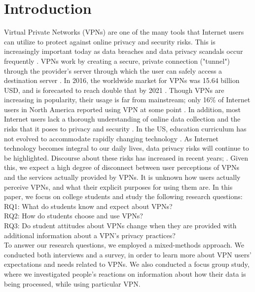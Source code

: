 \section{Introduction}

Virtual Private Networks (VPNs) are one of the many tools that Internet users can utilize to
protect against online privacy and security risks. This is increasingly important today as data breaches and data privacy scandals occur frequently \cite{brandom_4, grothaus_21, meyer_22, reilly_23, perlroth_24}. VPNs work by creating a
secure, private connection ("tunnel") through the provider's server through
which the user can safely access a destination server \cite{vaughan-nichols_25}.   In 2016, the
worldwide market for VPNs was 15.64 billion USD, and is forecasted to reach
double that by 2021 \cite{vpnmarket_3}. Though VPNs are
increasing in popularity, their usage is far from mainstream; only 16\% of
Internet users in North America reported using VPN at some point \cite{mander_27}. In
addition, most Internet users lack a thorough understanding of online data
collection and the risks that it poses to privacy and security \cite{shirazi_9}. In the US,
education curriculum has not evolved to accommodate rapidly changing
technology \cite{levin_29}. As Internet technology becomes integral to our daily lives, data privacy risks
will continue to be highlighted. Discourse about these risks has increased in
recent years; . Given this, we expect a high degree of disconnect between
user perceptions of VPNs and the services actually provided by VPNs. It is
unknown how users actually perceive VPNs, and what their explicit purposes for
using them are. In this paper, we focus on college students and study the
following research questions:\\
RQ1: What do students know and expect about VPNs?\\
RQ2: How do students choose and use VPNs?\\
RQ3: Do  student attitudes about VPNs change when they are  provided with additional information about a VPN's privacy practices?\\

To answer our research questions, we employed a mixed-methods approach. We conducted both interviews and a survey, in order to learn more about VPN users' expectations and needs related to VPNs. We also conducted a focus group study, where we investigated people's reactions on information about how their data is being processed, while using particular VPN.

